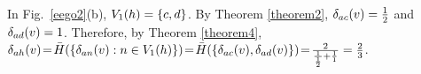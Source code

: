\begin{example}
In Fig.~\ref{eego2}(b), %
$\V{h}{1} = \{c,d\}$.
By Theorem \ref{theorem2}, $\D{a}{c}{v}=\frac{1}{2}$ and $\D{a}{d}{v}=1$.
Therefore, by Theorem \ref{theorem4}, $\D{a}{h}{v}\!=\!\bar{H}(\{\D{a}{n}{v} : n \in \V{h}{1}\})\!=\!\bar{H}(\{\D{a}{c}{v},\D{a}{d}{v}\})\!=\!\frac{2}{\frac{1}{\frac{1}{2}} + \frac{1}{1}}=\frac{2}{3}$.  
\end{example}

